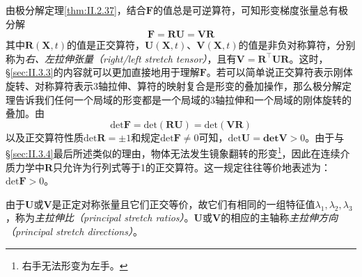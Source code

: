 \documentclass[main.tex]{subfiles}
\begin{document}
由极分解定理\ref{thm:II.2.37}，结合$\mathbf{F}$的值总是可逆算符，可知形变梯度张量总有极分解
\[\mathbf{F}=\mathbf{RU}=\mathbf{VR}\]
其中$\mathbf{R}\left(\mathbf{X},t\right)$的值是正交算符，$\mathbf{U}\left(\mathbf{X},t\right)$、$\mathbf{V}\left(\mathbf{X},t\right)$的值是非负对称算符，分别称为\emph{右、左拉伸张量（right/left stretch tensor）}，且有$\mathbf{V}=\mathbf{R}^\intercal\mathbf{UR}$。这时，\S\ref{sec:II.3.3}的内容就可以更加直接地用于理解$\mathbf{F}$。若可以简单说正交算符表示刚体旋转、对称算符表示3轴拉伸、算符的映射复合是形变的叠加操作，那么极分解定理告诉我们任何一个局域的形变都是一个局域的3轴拉伸和一个局域的刚体旋转的叠加。由
\[\mathrm{det}\mathbf{F}=\mathrm{det}\left(\mathbf{RU}\right)=\mathrm{det}\left(\mathbf{VR}\right)\]
以及正交算符性质$\mathrm{det}\mathbf{R}=\pm 1$和规定$\mathrm{det}\mathbf{F}\neq 0$可知，$\mathrm{det}\mathbf{U}=\mathbf{det}\mathbf{V}>0$。由于与\S\ref{sec:II.3.4}最后所述类似的理由，物体无法发生镜象翻转的形变\footnote{右手无法形变为左手。}，因此在连续介质力学中$\mathbf{R}$只允许为行列式等于1的正交算符。这一规定往往等价地表述为：$\mathrm{det}\mathbf{F}>0$。

由于$\mathbf{U}$或$\mathbf{V}$是正定对称张量且它们正交等价，故它们有相同的一组特征值$\lambda_1,\lambda_2,\lambda_3$，称为\emph{主拉伸比（principal stretch ratios）}。$\mathbf{U}$或$\mathbf{V}$的相应的主轴称\emph{主拉伸方向（principal stretch directions）}。
\end{document}

